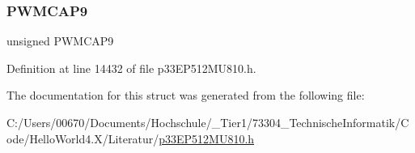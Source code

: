 \mbox{\label{structtag_p_w_m_c_a_p2_b_i_t_s_a9a0cd5d7a58681927adecfd9946b75fb}} 
\subsubsection{\texorpdfstring{P\+W\+M\+C\+A\+P9}{PWMCAP9}}
{\footnotesize\ttfamily unsigned P\+W\+M\+C\+A\+P9}



Definition at line 14432 of file p33\+E\+P512\+M\+U810.\+h.



The documentation for this struct was generated from the following file\+:\begin{DoxyCompactItemize}
\item 
C\+:/\+Users/00670/\+Documents/\+Hochschule/\+\_\+\+Tier1/73304\+\_\+\+Technische\+Informatik/\+Code/\+Hello\+World4.\+X/\+Literatur/\hyperlink{p33_e_p512_m_u810_8h}{p33\+E\+P512\+M\+U810.\+h}\end{DoxyCompactItemize}
